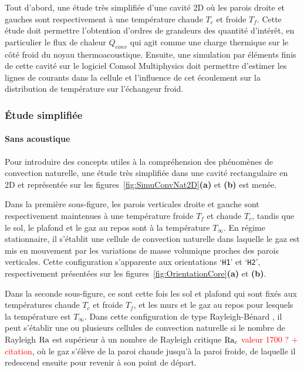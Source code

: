 Tout d'abord, une étude très simplifiée d'une cavité 2D où les parois droite et gauches sont respectivement à une température chaude $T_c$ et froide $T_f$. Cette étude doit permettre l'obtention d'ordres de grandeurs des quantité d'intérêt, en particulier le flux de chaleur $Q_{conv}$ qui agit comme une charge thermique sur le côté froid du noyau thermoacoustique. Ensuite, une simulation par éléments finis de cette cavité sur le logiciel Comsol Multiphysics doit permettre d'estimer les lignes de courants dans la cellule et l'influence de cet écoulement sur la distribution de température sur l'échangeur froid.

\subsubsection{\'Etude simplifiée}
\paragraph{Sans acoustique}
Pour introduire des concepts utiles à la compréhension des phénomènes de convection naturelle, une étude très simplifiée dans une cavité rectangulaire en 2D et représentée sur les figures~\ref{fig:SimuConvNat2D}\textbf{(a)} et \textbf{(b)} est menée. 

Dans la première sous-figure, les parois verticales droite et gauche sont respectivement maintenues à une température froide $T_f$ et chaude $T_c$, tandis que le sol, le plafond et le gaz au repos sont à la température $T_\infty$. En régime stationnaire, il s'établit une cellule de convection naturelle dans laquelle le gaz est mis en mouvement par les  variations de masse volumique proches des parois verticales. Cette configuration s'apparente aux orientations `\texttt{H1}' et `\texttt{H2}', respectivement présentées sur les figures~\ref{fig:OrientationCore}\textbf{(a)} et \textbf{(b)}.

Dans la seconde sous-figure, ce sont cette fois les sol et plafond qui sont fixés aux températures chaude $T_c$ et froide $T_f$, et les murs et le gaz au repos pour lesquels la température est $T_\infty$. Dans cette configuration de type \og Rayleigh-Bénard \fg{} , il peut s'établir une ou plusieurs cellules de convection naturelle si le nombre de Rayleigh $\mathrm{Ra}$ est supérieur à un nombre de Rayleigh critique $\mathrm{Ra}_c$ \textcolor{red}{valeur 1700 ? + citation}, où le gaz s'élève de la paroi chaude jusqu'à la paroi froide, de laquelle il redescend ensuite pour revenir à son point de départ.

